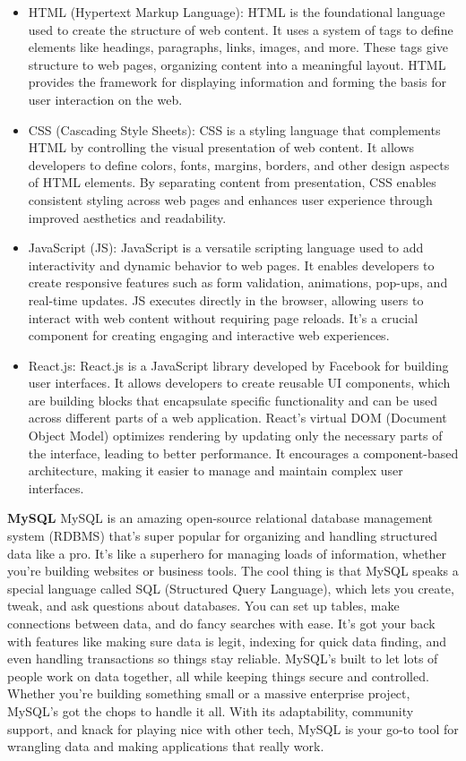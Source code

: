 \begin{itemize}
    \item HTML (Hypertext Markup Language): HTML is the foundational language used to create the structure of web content. It uses a system of tags to define elements like headings, paragraphs, links, images, and more. These tags give structure to web pages, organizing content into a meaningful layout. HTML provides the framework for displaying information and forming the basis for user interaction on the web.

    \item CSS (Cascading Style Sheets): CSS is a styling language that complements HTML by controlling the visual presentation of web content. It allows developers to define colors, fonts, margins, borders, and other design aspects of HTML elements. By separating content from presentation, CSS enables consistent styling across web pages and enhances user experience through improved aesthetics and readability.

    \item JavaScript (JS): JavaScript is a versatile scripting language used to add interactivity and dynamic behavior to web pages. It enables developers to create responsive features such as form validation, animations, pop-ups, and real-time updates. JS executes directly in the browser, allowing users to interact with web content without requiring page reloads. It's a crucial component for creating engaging and interactive web experiences.

    \item React.js: React.js is a JavaScript library developed by Facebook for building user interfaces. It allows developers to create reusable UI components, which are building blocks that encapsulate specific functionality and can be used across different parts of a web application. React's virtual DOM (Document Object Model) optimizes rendering by updating only the necessary parts of the interface, leading to better performance. It encourages a component-based architecture, making it easier to manage and maintain complex user interfaces.
\end{itemize}
\textbf{MySQL}
\newline
MySQL is an amazing open-source relational database management system (RDBMS) that's super popular for organizing and handling structured data like a pro. It's like a superhero for managing loads of information, whether you're building websites or business tools. The cool thing is that MySQL speaks a special language called SQL (Structured Query Language), which lets you create, tweak, and ask questions about databases. You can set up tables, make connections between data, and do fancy searches with ease. It's got your back with features like making sure data is legit, indexing for quick data finding, and even handling transactions so things stay reliable. MySQL's built to let lots of people work on data together, all while keeping things secure and controlled. Whether you're building something small or a massive enterprise project, MySQL's got the chops to handle it all. With its adaptability, community support, and knack for playing nice with other tech, MySQL is your go-to tool for wrangling data and making applications that really work.
